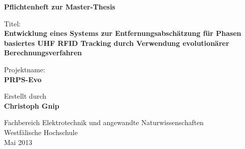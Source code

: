 
\begin{center}
{\Huge \textbf{Pflichtenheft zur Master-Thesis}\par}
\vspace{1cm}

{\large Titel: \\
\textbf{Entwicklung eines Systems zur Entfernungsabschätzung für
Phasen basiertes UHF RFID Tracking durch Verwendung evolutionärer Berechnungsverfahren}\par}
\vspace{1cm}

{\large Projektname:\\ 
\textbf{PRPS-Evo}\par}

\vspace{2cm}

\large{Erstellt durch}\\
\Large{\textbf{Christoph Gnip}}

\vfill

{\normalsize Fachbereich Elektrotechnik und angewandte Naturwissenschaften\\
Westfälische Hochschule\\[2ex]Mai 2013}


\end{center}
\newpage